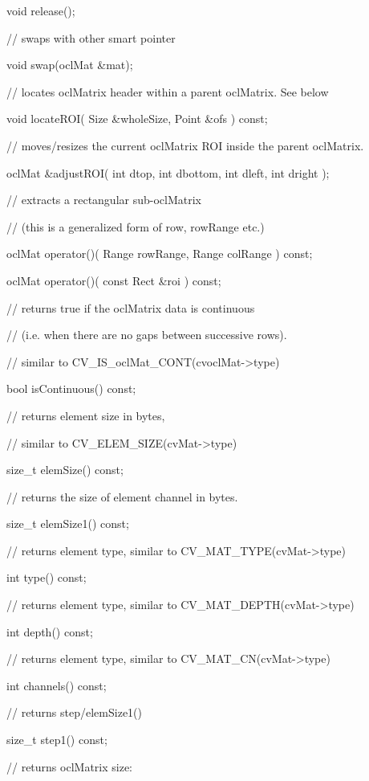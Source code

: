 \documentclass{article}
\begin{document}
     void release();


     // swaps with other smart pointer

     void swap(oclMat \&mat);


     // locates oclMatrix header within a parent oclMatrix. See below

     void locateROI( Size \&wholeSize, Point \&ofs ) const;

     // moves/resizes the current oclMatrix ROI inside the parent oclMatrix.

     oclMat \&adjustROI( int dtop, int dbottom, int dleft, int dright );

     // extracts a rectangular sub-oclMatrix

     // (this is a generalized form of row, rowRange etc.)

     oclMat operator()( Range rowRange, Range colRange ) const;

     oclMat operator()( const Rect \&roi ) const;


     // returns true if the oclMatrix data is continuous

     // (i.e. when there are no gaps between successive rows).

     // similar to CV\_IS\_oclMat\_CONT(cvoclMat-\textgreater type)

     bool isContinuous() const;

     // returns element size in bytes,

     // similar to CV\_ELEM\_SIZE(cvMat-\textgreater type)

     size\_t elemSize() const;

     // returns the size of element channel in bytes.

     size\_t elemSize1() const;

     // returns element type, similar to CV\_MAT\_TYPE(cvMat-\textgreater type)

     int type() const;

     // returns element type, similar to CV\_MAT\_DEPTH(cvMat-\textgreater type)

     int depth() const;

     // returns element type, similar to CV\_MAT\_CN(cvMat-\textgreater type)

     int channels() const;

     // returns step/elemSize1()

     size\_t step1() const;

     // returns oclMatrix size:
\end{document}
